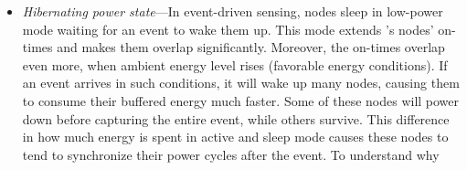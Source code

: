 \begin{itemize}[leftmargin=*]
\begin{figure}
{	}
	\label{fig:noRand}
\end{figure} 
%
	\item \label{it:hibernating} \textit{Hibernating power state}---In event-driven sensing, nodes sleep in low-power mode waiting for an event to wake them up. This mode extends \cis's nodes' on-times and makes them overlap significantly. Moreover, the on-times overlap even more, when ambient energy level rises (favorable energy conditions). If an event arrives in such conditions, it will wake up many nodes, causing them to consume their buffered energy much faster. Some of these nodes will power down before capturing the entire event, while others survive. This difference in how much energy is spent in active and sleep mode causes these nodes to tend to synchronize their power cycles after the event. To understand why

\end{itemize}
